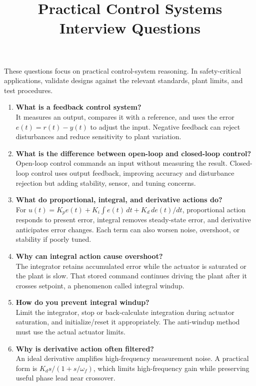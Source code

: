 \documentclass[11pt]{article}
\title{Practical Control Systems Interview Questions}
\author{}
\date{}
\begin{document}
\maketitle
\noindent These questions focus on practical control-system reasoning. In safety-critical applications, validate designs against the relevant standards, plant limits, and test procedures.

\begin{enumerate}
\renewcommand{\labelenumi}{\textbf{\arabic{enumi}.}}
\setlength{\itemsep}{0.8em}
\item \textbf{What is a feedback control system?}\\
It measures an output, compares it with a reference, and uses the error $e(t)=r(t)-y(t)$ to adjust the input. Negative feedback can reject disturbances and reduce sensitivity to plant variation.

\item \textbf{What is the difference between open-loop and closed-loop control?}\\
Open-loop control commands an input without measuring the result. Closed-loop control uses output feedback, improving accuracy and disturbance rejection but adding stability, sensor, and tuning concerns.

\item \textbf{What do proportional, integral, and derivative actions do?}\\
For $u(t)=K_pe(t)+K_i\int e(t)\,dt+K_d\,de(t)/dt$, proportional action responds to present error, integral removes steady-state error, and derivative anticipates error changes. Each term can also worsen noise, overshoot, or stability if poorly tuned.

\item \textbf{Why can integral action cause overshoot?}\\
The integrator retains accumulated error while the actuator is saturated or the plant is slow. That stored command continues driving the plant after it crosses setpoint, a phenomenon called integral windup.

\item \textbf{How do you prevent integral windup?}\\
Limit the integrator, stop or back-calculate integration during actuator saturation, and initialize/reset it appropriately. The anti-windup method must use the actual actuator limits.

\item \textbf{Why is derivative action often filtered?}\\
An ideal derivative amplifies high-frequency measurement noise. A practical form is $K_d s/(1+s/\omega_f)$, which limits high-frequency gain while preserving useful phase lead near crossover.


\end{enumerate}
\end{document}
